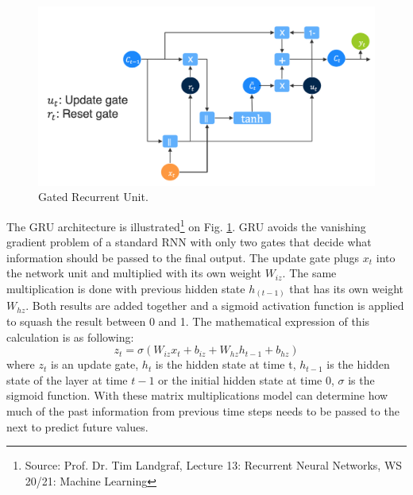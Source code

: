 \begin{figure}[htb]
	\begin{center}
		\includegraphics[width=1\textwidth, keepaspectratio]{gfx/gru.png}
		\caption{\label{fig:gru}Gated Recurrent Unit.}
	\end{center}
\end{figure}

The GRU architecture is illustrated\footnote{Source: Prof. Dr. Tim Landgraf, Lecture 13: Recurrent Neural Networks, WS 20/21: Machine Learning} on Fig. \ref{fig:gru}. GRU avoids the vanishing gradient problem of a standard RNN with only two gates that decide what information should be passed to the final output. The update gate plugs $x_t$ into the network unit and multiplied with its own weight $W_{iz}$. The same multiplication is done with previous hidden state $h_(t-1)$ that has its own weight $W_{hz}$. Both results are added together and a sigmoid activation function is applied to squash the result between 0 and 1. The mathematical expression of this calculation is as following:
\begin{equation}
z_t = \sigma (W_{iz}x_t + b_{iz} + W_{hz}h_{t-1} + b_{hz})
\end{equation}
where  $z_t$ is an update gate, $h_{t}$  is the hidden state at time t, $h_{t-1}$ is the hidden state of the layer at time $t-1$ or the initial hidden state at time $0$, $\sigma$ is the sigmoid function. With these matrix multiplications model can determine how much of the past information from previous time steps needs to be passed to the next to predict future values. 


